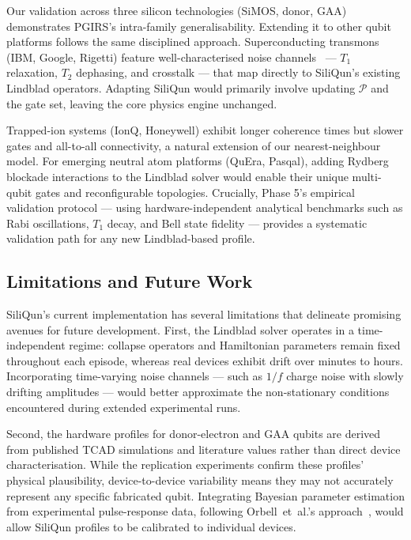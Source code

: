 Our validation across three silicon technologies (SiMOS, donor, GAA) demonstrates PGIRS's intra-family generalisability. Extending it to other qubit platforms follows the same disciplined approach. Superconducting transmons (IBM, Google, Rigetti) feature well-characterised noise channels~\cite{Krantz2019} — $T_1$ relaxation, $T_2$ dephasing, and crosstalk — that map directly to SiliQun's existing Lindblad operators. Adapting SiliQun would primarily involve updating $\mathcal{P}$ and the gate set, leaving the core physics engine unchanged.

Trapped-ion systems (IonQ, Honeywell) exhibit longer coherence times but slower gates and all-to-all connectivity, a natural extension of our nearest-neighbour model. For emerging neutral atom platforms (QuEra, Pasqal), adding Rydberg blockade interactions to the Lindblad solver would enable their unique multi-qubit gates and reconfigurable topologies. Crucially, Phase 5's empirical validation protocol — using hardware-independent analytical benchmarks such as Rabi oscillations, $T_1$ decay, and Bell state fidelity — provides a systematic validation path for any new Lindblad-based profile.

\subsection{Limitations and Future Work}
\label{subsec:limitations}

SiliQun's current implementation has several limitations that delineate promising avenues for future development. First, the Lindblad solver operates in a time-independent regime: collapse operators and Hamiltonian parameters remain fixed throughout each episode, whereas real devices exhibit drift over minutes to hours. Incorporating time-varying noise channels — such as $1/f$ charge noise with slowly drifting amplitudes — would better approximate the non-stationary conditions encountered during extended experimental runs.

Second, the hardware profiles for donor-electron and GAA qubits are derived from published TCAD simulations and literature values rather than direct device characterisation. While the replication experiments confirm these profiles' physical plausibility, device-to-device variability means they may not accurately represent any specific fabricated qubit. Integrating Bayesian parameter estimation from experimental pulse-response data, following Orbell~et~al.'s approach~\cite{Orbell2024}, would allow SiliQun profiles to be calibrated to individual devices.

